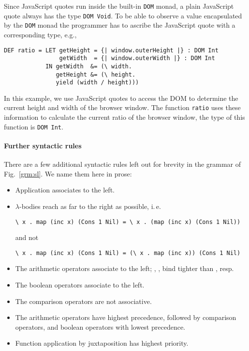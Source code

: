 \documentclass{article}
\begin{document}
Since JavaScript quotes run inside the built-in \verb|DOM| monad, a
plain JavaScript quote always has the type \verb|DOM Void|. To be able
to observe a value encapsulated by the \verb|DOM| monad the programmer
has to ascribe the JavaScript quote with a corresponding type, e.g.,
\begin{verbatim}
DEF ratio = LET getHeight = {| window.outerHeight |} : DOM Int
                getWidth  = {| window.outerWidth |} : DOM Int
            IN getWidth  &= (\ width.
               getHeight &= (\ height.
               yield (width / height)))
\end{verbatim}
In this example, we use JavaScript quotes to access the DOM to
determine the current height and width of the browser window. The
function \verb|ratio| uses these information to calculate the current
ratio of the browser window, the type of this function is
\verb|DOM Int|.


\paragraph{Further syntactic rules}
\label{sec:furth-synt-rules}

There are a few additional syntactic rules left out for brevity in the
grammar of Fig.~\ref{grm:sl}. We name them here in prose:

\begin{itemize}
\item Application associates to the left.
\item $\lambda$-bodies reach as far to the right as possible, i.\,e.
\begin{verbatim}
\ x . map (inc x) (Cons 1 Nil) = \ x . (map (inc x) (Cons 1 Nil))
\end{verbatim}
and not
\begin{verbatim}
\ x . map (inc x) (Cons 1 Nil) = (\ x . map (inc x)) (Cons 1 Nil)
\end{verbatim}
\item The arithmetic operators associate to the left; \mulint, \divint,
  bind tighter than \addint, \subint{} resp.
\item The boolean operators associate to the left.
\item The comparison operators are not associative.
\item The arithmetic operators have highest precedence, followed by
  comparison operators, and boolean operators with lowest precedence.
\item Function application by juxtaposition has highest priority.
\end{itemize}
\end{document}
